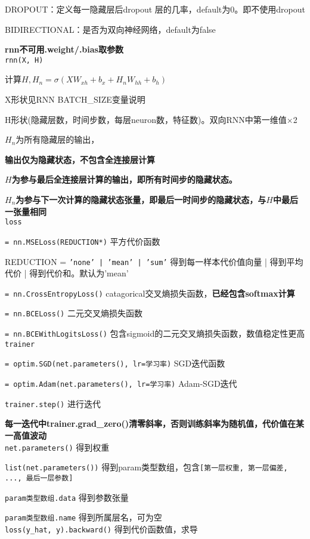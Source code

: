 \documentclass[UTF8]{ctexart}
\begin{document}
  DROPOUT：定义每一隐藏层后dropout 层的几率，default为0。即不使用dropout

  BIDIRECTIONAL：是否为双向神经网络，default为false
  
  \textbf{rnn不可用.weight/.bias取参数}\\
\texttt{rnn(X, H)}

  计算$H, H_n = \sigma(XW_{xh} + b_x + H_nW_{hh} + b_h)$

  \quad X形状见RNN BATCH\_SIZE变量说明

  \quad H形状(隐藏层数，时间步数，每层neuron数，特征数)。双向RNN中第一维值$\times$2

  \quad $H_n$为所有隐藏层的输出，
  
  \textbf{输出仅为隐藏状态，不包含全连接层计算}

  \textbf{$H$为参与最后全连接层计算的输出，即所有时间步的隐藏状态。}
  
  \textbf{$H_n$为参与下一次计算的隐藏状态张量，即最后一时间步的隐藏状态，与$H$中最后一张量相同}\\
\texttt{loss}

  \texttt{= nn.MSELoss(REDUCTION*)} 平方代价函数

  \quad REDUCTION = \texttt{'none' | 'mean' | 'sum'} 得到每一样本代价值向量 | 得到平均代价 | 得到代价和。默认为'mean'

  \texttt{= nn.CrossEntropyLoss()} catagorical交叉熵损失函数，\textbf{已经包含softmax计算}
  
  \texttt{= nn.BCELoss()} 二元交叉熵损失函数
  
  \texttt{= nn.BCEWithLogitsLoss()} 包含sigmoid的二元交叉熵损失函数，数值稳定性更高\\
\texttt{trainer}

  \texttt{= optim.SGD(net.parameters(), lr=学习率)} SGD迭代函数

  \texttt{= optim.Adam(net.parameters(), lr=学习率)} Adam-SGD迭代

  \texttt{trainer.step()} 进行迭代
  
  \textbf{每一迭代中trainer.grad\_zero()清零斜率，否则训练斜率为随机值，代价值在某一高值波动}\\
\texttt{net.parameters()} 得到权重

  \texttt{list(net.parameters())} 得到param类型数组，包含\texttt{[第一层权重, 第一层偏差, ..., 最后一层参数]}
  
  \texttt{param类型数组.data} 得到参数张量
  
  \texttt{param类型数组.name} 得到所属层名，可为空\\
\texttt{loss(y\_hat, y).backward()} 得到代价函数值，求导
\end{document}
